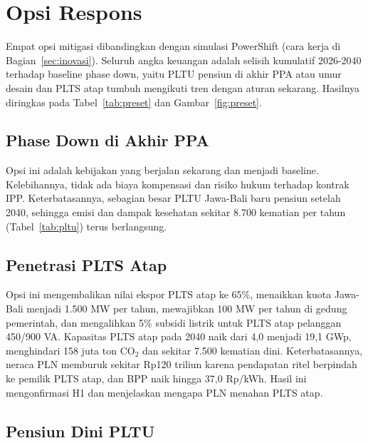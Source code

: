 \section{Opsi Respons}
\label{sec:opsi}

Empat opsi mitigasi dibandingkan dengan simulasi PowerShift (cara kerja di Bagian~\ref{sec:inovasi}). Seluruh angka keuangan adalah selisih kumulatif 2026-2040 terhadap baseline phase down, yaitu PLTU pensiun di akhir PPA atau umur desain dan PLTS atap tumbuh mengikuti tren dengan aturan sekarang. Hasilnya diringkas pada Tabel~\ref{tab:preset} dan Gambar~\ref{fig:preset}.

\begin{table}[H]
\centering
\caption{Hasil simulasi empat opsi, kumulatif 2026-2040 terhadap baseline phase down}
\label{tab:preset}
\small
\resizebox{\textwidth}{!}{}
\end{table}

\subsection{Phase Down di Akhir PPA}

Opsi ini adalah kebijakan yang berjalan sekarang dan menjadi baseline. Kelebihannya, tidak ada biaya kompensasi dan risiko hukum terhadap kontrak IPP. Keterbatasannya, sebagian besar PLTU Jawa-Bali baru pensiun setelah 2040, sehingga emisi dan dampak kesehatan sekitar 8.700 kematian per tahun (Tabel~\ref{tab:pltu}) terus berlangsung.

\subsection{Penetrasi PLTS Atap}

Opsi ini mengembalikan nilai ekspor PLTS atap ke 65\%, menaikkan kuota Jawa-Bali menjadi 1.500 MW per tahun, mewajibkan 100 MW per tahun di gedung pemerintah, dan mengalihkan 5\% subsidi listrik untuk PLTS atap pelanggan 450/900 VA. Kapasitas PLTS atap pada 2040 naik dari 4,0 menjadi 19,1 GWp, menghindari 158 juta ton CO$_2$ dan sekitar 7.500 kematian dini. Keterbatasannya, neraca PLN memburuk sekitar Rp120 triliun karena pendapatan ritel berpindah ke pemilik PLTS atap, dan BPP naik hingga 37,0 Rp/kWh. Hasil ini mengonfirmasi H1 dan menjelaskan mengapa PLN menahan PLTS atap.

\subsection{Pensiun Dini PLTU}

